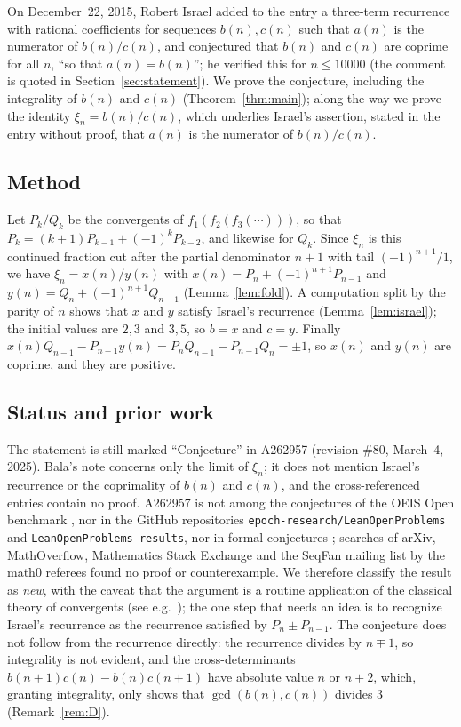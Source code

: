 \documentclass[11pt]{amsart}
\theoremstyle{plain}
\theoremstyle{definition}
\begin{document}
On December~22, 2015, Robert Israel added to the entry a three-term recurrence with rational coefficients for sequences $b(n),c(n)$ such that $a(n)$ is the numerator of $b(n)/c(n)$, and conjectured that $b(n)$ and $c(n)$ are coprime for all $n$, ``so that $a(n)=b(n)$''; he verified this for $n\le10000$ (the comment is quoted in Section~\ref{sec:statement}).
We prove the conjecture, including the integrality of $b(n)$ and $c(n)$ (Theorem~\ref{thm:main}); along the way we prove the identity $\xi_n=b(n)/c(n)$, which underlies Israel's assertion, stated in the entry without proof, that $a(n)$ is the numerator of $b(n)/c(n)$.

\subsection*{Method}
Let $P_k/Q_k$ be the convergents of $f_1(f_2(f_3(\cdots)))$, so that $P_k=(k+1)P_{k-1}+(-1)^kP_{k-2}$, and likewise for $Q_k$.
Since $\xi_n$ is this continued fraction cut after the partial denominator $n+1$ with tail $(-1)^{n+1}/1$, we have $\xi_n=x(n)/y(n)$ with $x(n)=P_n+(-1)^{n+1}P_{n-1}$ and $y(n)=Q_n+(-1)^{n+1}Q_{n-1}$ (Lemma~\ref{lem:fold}).
A computation split by the parity of $n$ shows that $x$ and $y$ satisfy Israel's recurrence (Lemma~\ref{lem:israel}); the initial values are $2,3$ and $3,5$, so $b=x$ and $c=y$.
Finally $x(n)Q_{n-1}-P_{n-1}y(n)=P_nQ_{n-1}-P_{n-1}Q_n=\pm1$, so $x(n)$ and $y(n)$ are coprime, and they are positive.

\subsection*{Status and prior work}
The statement is still marked ``Conjecture'' in A262957 (revision \#80, March~4, 2025).
Bala's note \cite{Bala} concerns only the limit of $\xi_n$; it does not mention Israel's recurrence or the coprimality of $b(n)$ and $c(n)$, and the cross-referenced entries \cite{A263295,A346590,A244279,A244280} contain no proof.
A262957 is not among the conjectures of the OEIS Open benchmark \cite{Ad}, nor in the GitHub repositories \texttt{epoch-research/LeanOpenProblems} and \texttt{LeanOpenProblems-results}, nor in formal-conjectures \cite{FC}; searches of arXiv, MathOverflow, Mathematics Stack Exchange and the SeqFan mailing list by the math0 referees found no proof or counterexample.
We therefore classify the result as \emph{new}, with the caveat that the argument is a routine application of the classical theory of convergents (see e.g.\ \cite{LW}); the one step that needs an idea is to recognize Israel's recurrence as the recurrence satisfied by $P_n\pm P_{n-1}$.
The conjecture does not follow from the recurrence directly: the recurrence divides by $n\mp1$, so integrality is not evident, and the cross-determinants $b(n+1)c(n)-b(n)c(n+1)$ have absolute value $n$ or $n+2$, which, granting integrality, only shows that $\gcd(b(n),c(n))$ divides $3$ (Remark~\ref{rem:D}).
\end{document}
